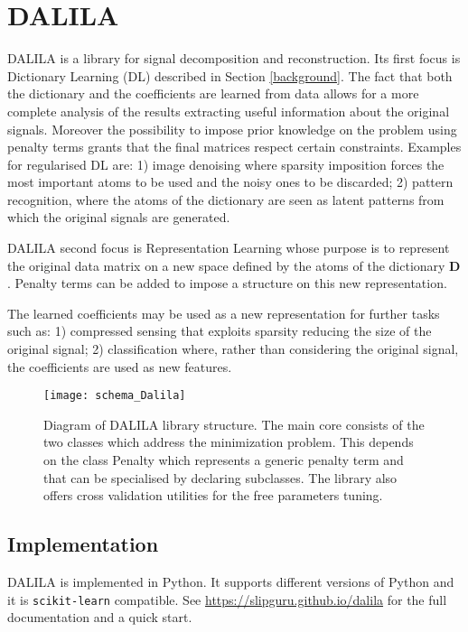 \section{DALILA}\label{codesec}
DALILA is a library for signal decomposition and reconstruction. Its first focus is Dictionary Learning (DL) described in Section \ref{background}. The fact that both the dictionary and the coefficients are learned from data allows for a more complete analysis of the results  extracting useful information about the original signals. Moreover the possibility to impose prior knowledge on the problem using penalty terms grants that the final matrices respect certain constraints.
Examples for regularised DL are: 1) image denoising where sparsity imposition forces the most important atoms to be used and the noisy ones to be discarded; 2) pattern recognition, where the atoms of the dictionary are seen as latent patterns from which the original signals are generated.

DALILA second focus is Representation Learning whose purpose is to represent the original data matrix on a new space defined by the atoms of the dictionary $\mathbf{D}$. Penalty terms can be added to impose a structure on this new representation.

The learned coefficients may be used as a new representation for further tasks such as: 1) compressed sensing that exploits sparsity reducing the size of the original signal; 2) classification where, rather than considering the original signal, the coefficients are used as new features.

\begin{figure}[!h]
\centering
\texttt{[image: schema\_Dalila]}
\caption{Diagram of DALILA library structure.
The main core consists of the two classes which address the minimization problem.
This depends on the class Penalty which represents a generic penalty term and that can be specialised by declaring subclasses.
 The library also offers cross validation utilities for the free parameters tuning. }
\label{schema}
\end{figure}

\subsection{Implementation}
DALILA is implemented in Python. It supports different versions of Python and it is \texttt{scikit-learn} compatible. See \url{https://slipguru.github.io/dalila} for the full documentation and a quick start.

